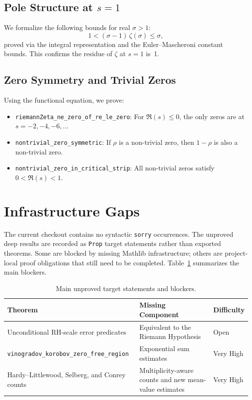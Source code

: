 \documentclass[11pt,a4paper]{article}
\theoremstyle{remark}
\begin{document}
\subsection{Pole Structure at \texorpdfstring{$s=1$}{s=1}}

We formalize the following bounds for real $\sigma>1$:
\[
1 < (\sigma-1)\,\zeta(\sigma) \leq \sigma,
\]
proved via the integral representation and the Euler--Mascheroni constant
bounds. This confirms the residue of $\zeta$ at $s=1$ is~1.

\subsection{Zero Symmetry and Trivial Zeros}

Using the functional equation, we prove:
\begin{itemize}[noitemsep]
  \item \texttt{riemannZeta\_ne\_zero\_of\_re\_le\_zero}: For $\Re(s)\leq 0$,
    the only zeros are at $s=-2,-4,-6,\dots$
  \item \texttt{nontrivial\_zero\_symmetric}: If $\rho$ is a non-trivial zero,
    then $1-\rho$ is also a non-trivial zero.
  \item \texttt{nontrivial\_zero\_in\_critical\_strip}: All non-trivial zeros
    satisfy $0<\Re(s)<1$.
\end{itemize}

\section{Infrastructure Gaps}

The current checkout contains no syntactic \texttt{sorry} occurrences.  The
unproved deep results are recorded as \texttt{Prop} target statements rather
than exported theorems.  Some are blocked by missing Mathlib infrastructure;
others are project-local proof obligations that still need to be completed.
Table~\ref{tab:gaps} summarizes the main blockers.

\begin{table}[ht]
\centering
\caption{Main unproved target statements and blockers.}
\label{tab:gaps}
\begin{tabular}{lll}
\toprule
\textbf{Theorem} & \textbf{Missing Component} & \textbf{Difficulty} \\
\midrule
Unconditional RH-scale error predicates
  & Equivalent to the Riemann Hypothesis & Open \\
\texttt{vinogradov\_korobov\_zero\_free\_region}
  & Exponential sum estimates & Very High \\
Hardy--Littlewood, Selberg, and Conrey counts
  & Multiplicity-aware counts and new mean-value estimates & Very High \\
\bottomrule
\end{tabular}
\end{table}
\end{document}
